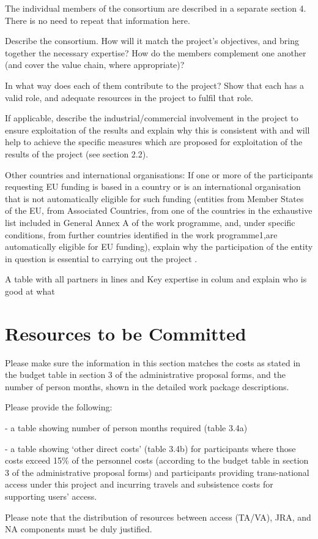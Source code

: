 \begin{todo}{}\color{red}

  The individual members of the consortium are described in a separate
  section 4. There is no need to repeat that information here.

  Describe the consortium. How will it match the project’s objectives, and bring together the necessary expertise? How do the members complement one another (and cover the value chain, where appropriate)? 

  In what way does each of them contribute to the project? Show that each has a valid role, and adequate resources in the project to fulfil that role. 

  If applicable, describe the industrial/commercial involvement in the project to ensure exploitation of the results and explain why this is consistent with and will help to achieve the specific measures which are proposed for exploitation of the results of the project (see section 2.2). 

  Other countries and international organisations: If one or more of the participants requesting EU funding is based in a country or is an international organisation that is not automatically eligible for such funding (entities from Member States of the EU, from Associated Countries, from one of the countries in the exhaustive list included in General Annex A of the work programme, and, under specific conditions, from further countries identified in the work programme1,are automatically eligible for EU funding), explain why the participation of the entity in question is essential to carrying out the project .
\end{todo}



{\color{red} A table with all partners in lines and Key expertise in colum
  and explain who is good at what}


\section{Resources to be Committed}\label{sec:resources}

\begin{todo}{}\color{red}
Please make sure the information in this section matches the costs as stated in the budget table in section 3 of the administrative proposal forms, and the number of person months, shown in the detailed work package descriptions.

Please provide the following:

- a table showing number of person months required (table 3.4a)

- a table showing ‘other direct costs’ (table 3.4b) for participants where those  costs exceed 15\% of the personnel costs (according to the budget  table in section 3 of the administrative proposal forms) and participants providing trans-national access under this project and incurring travels and subsistence costs for supporting users' access.

Please note that the distribution of resources between access (TA/VA), JRA, and NA components must be duly justified.
\end{todo}


